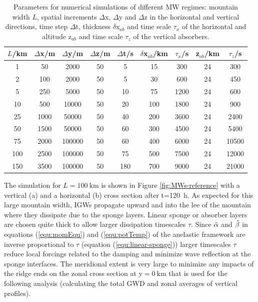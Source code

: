\begin{table}[t]
    \centering
    \caption{Parameters for numerical simulations of different MW regimes: mountain width $L$, spatial increments $\Delta$x, $\Delta$y and $\Delta$z in the horizontal and vertical directions, time step $\Delta$t, thickness $\delta$x$_{ab}$ and time scale $\tau_x$ of the horizontal and altitude z$_{ab}$ and time scale $\tau_z$ of the vertical absorbers.}
    \begin{tabular}{@{}ccccccccc@{}}
    \toprule
    $L$/km & $\Delta$x/m & $\Delta$y/m & $\Delta$z/m & $\Delta$t/s & $\delta$x$_{ab}$/km & $\tau_x$/s  & z$_{ab}$/km & $\tau_z$/s \\ \midrule[1pt]
    1   & 50 & 2000 & 50 & 5   & 15  & 300  & 24 & 300   \\
    2   & 100 & 2000 & 50 & 5   & 30  & 600  & 24 & 450   \\
    5   & 250 & 5000 & 50 & 10  & 75  & 1200 & 24 & 600  \\
    10  & 500 & 10000 & 50 & 20  & 100 & 1800 & 24 & 900  \\
    25  & 1000 & 50000 & 50 & 40  & 200 & 3600 & 24 & 2400  \\
    50  & 1500 & 50000 & 50 & 60  & 300 & 4500 & 24 & 5400  \\
    75  & 2000 & 100000 & 50 & 60  & 400 & 6000 & 24 & 10500 \\
    100 & 2500 & 100000 & 50 & 75  & 500 & 7500 & 24 & 12000 \\
    150 & 3500 & 100000 & 50 & 180 & 700 & 9000 & 24 & 21000 \\
    \bottomrule
    \end{tabular}
    \label{tab:linearRegimes}
\end{table}
The simulation for $L=\SI{100}{\kilo\meter}$ is shown in Figure \ref{fig:MWs-reference} with a vertical (a) and a horizontal (b) cross section after t=\SI{120}{\hour}. As expected for this large mountain width, IGWs propagate upward and into the lee of the mountain where they dissipate due to the sponge layers. Linear sponge or absorber layers are chosen quite thick to allow larger dissipation timescales $\tau$. Since $\Tilde{\alpha}$ and $\Tilde{\beta}$ in equations (\ref{equ:momEqu}) and (\ref{equ:potTemp}) of the anelastic framework are inverse proportional to $\tau$ (equation (\ref{equ:linear-sponge})) larger timescales $\tau$ reduce local forcings related to the damping and minimize wave reflection at the sponge interfaces. The meridional extent is very large to minimize any impacts of the ridge ends on the zonal cross section at y$=\SI{0}{\kilo\meter}$ that is used for the following analysis (calculating the total GWD and zonal averages of vertical profiles).
